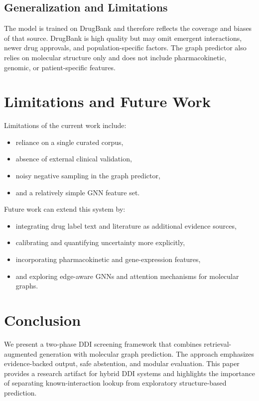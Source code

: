 \documentclass[conference]{IEEEtran}
\begin{document}
\subsection{Generalization and Limitations}
The model is trained on DrugBank and therefore reflects the coverage and biases of that source. DrugBank is high quality but may omit emergent interactions, newer drug approvals, and population-specific factors. The graph predictor also relies on molecular structure only and does not include pharmacokinetic, genomic, or patient-specific features.

\section{Limitations and Future Work}
Limitations of the current work include:
\begin{itemize}
    \item reliance on a single curated corpus,
    \item absence of external clinical validation,
    \item noisy negative sampling in the graph predictor,
    \item and a relatively simple GNN feature set.
\end{itemize}

Future work can extend this system by:
\begin{itemize}
    \item integrating drug label text and literature as additional evidence sources,
    \item calibrating and quantifying uncertainty more explicitly,
    \item incorporating pharmacokinetic and gene-expression features,
    \item and exploring edge-aware GNNs and attention mechanisms for molecular graphs.
\end{itemize}

\section{Conclusion}
We present a two-phase DDI screening framework that combines retrieval-augmented generation with molecular graph prediction. The approach emphasizes evidence-backed output, safe abstention, and modular evaluation. This paper provides a research artifact for hybrid DDI systems and highlights the importance of separating known-interaction lookup from exploratory structure-based prediction.
\end{document}
